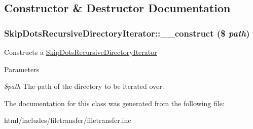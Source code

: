 \subsection{Constructor \& Destructor Documentation}
\hypertarget{classSkipDotsRecursiveDirectoryIterator_a88cbeecb3801d63b0a6cb15e1d7445a1}{
\subsubsection[{\_\-\_\-construct}]{\setlength{\rightskip}{0pt plus 5cm}SkipDotsRecursiveDirectoryIterator::\_\-\_\-construct (\$ {\em path})}}
\label{classSkipDotsRecursiveDirectoryIterator_a88cbeecb3801d63b0a6cb15e1d7445a1}
Constructs a \hyperlink{classSkipDotsRecursiveDirectoryIterator}{SkipDotsRecursiveDirectoryIterator}


\begin{DoxyParams}{Parameters}
\item[{\em \$path}]The path of the directory to be iterated over. \end{DoxyParams}


The documentation for this class was generated from the following file:\begin{DoxyCompactItemize}
\item 
html/includes/filetransfer/filetransfer.inc\end{DoxyCompactItemize}
